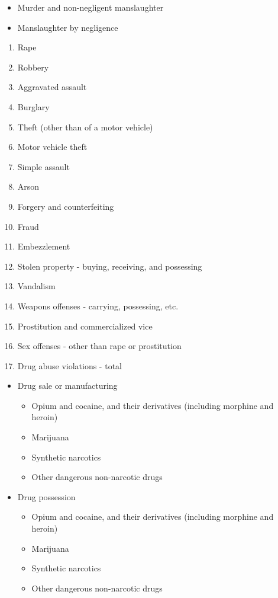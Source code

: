 \documentclass[
  12pt,
  openany]{book}
\providecommand{\tightlist}{%
  \setlength{\itemsep}{0pt}\setlength{\parskip}{0pt}}
\begin{document}
\begin{itemize}
\tightlist
\item
  Murder and non-negligent manslaughter
\item
  Manslaughter by negligence
\end{itemize}

\begin{enumerate}
\def\labelenumi{\arabic{enumi}.}
\setcounter{enumi}{1}
\tightlist
\item
  Rape
\item
  Robbery
\item
  Aggravated assault
\item
  Burglary
\item
  Theft (other than of a motor vehicle)
\item
  Motor vehicle theft
\item
  Simple assault
\item
  Arson
\item
  Forgery and counterfeiting
\item
  Fraud
\item
  Embezzlement
\item
  Stolen property - buying, receiving, and possessing
\item
  Vandalism
\item
  Weapons offenses - carrying, possessing, etc.
\item
  Prostitution and commercialized vice
\item
  Sex offenses - other than rape or prostitution
\item
  Drug abuse violations - total
\end{enumerate}

\begin{itemize}
\tightlist
\item
  Drug sale or manufacturing

  \begin{itemize}
  \tightlist
  \item
    Opium and cocaine, and their derivatives (including morphine and heroin)
  \item
    Marijuana
  \item
    Synthetic narcotics
  \item
    Other dangerous non-narcotic drugs
  \end{itemize}
\item
  Drug possession

  \begin{itemize}
  \tightlist
  \item
    Opium and cocaine, and their derivatives (including morphine and heroin)
  \item
    Marijuana
  \item
    Synthetic narcotics
  \item
    Other dangerous non-narcotic drugs
  \end{itemize}
\end{itemize}
\end{document}
